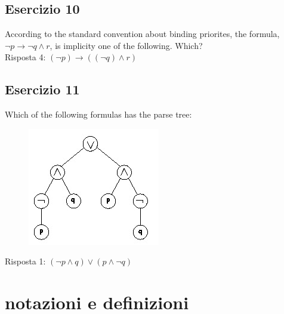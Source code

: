 \documentclass[a4paper]{article}
\begin{document}
\subsection{Esercizio 10}
According to the standard convention about binding priorites, the formula, $ \lnot p \rightarrow \lnot q \land r $, is implicity one of the following. Which?\\
Risposta 4: $ ( \lnot p) \rightarrow (( \lnot q) \land r) $
\subsection{Esercizio 11}
Which of the following formulas has the parse tree:\\
\begin{figure}[H]
	\centering
	\includegraphics[scale = 0.5]{parsetree.jpg}
\end{figure}
Risposta 1: $ ( \lnot p \land q) \lor (p \land \lnot q) $

\section{notazioni e definizioni}
\end{document}
